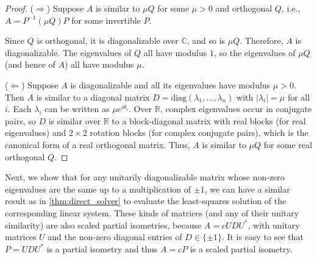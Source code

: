 \documentclass[a4paper,fleqn]{cas-sc}
\theoremstyle{definition}
\theoremstyle{remark}
\begin{document}




\begin{proof}
($\Rightarrow$) Suppose $A$ is similar to $\mu Q$ for some $\mu > 0$ and orthogonal $Q$, i.e., $A = P^{-1} (\mu Q) P$ for some invertible $P$. 

Since $Q$ is orthogonal, it is diagonalizable over $\mathbb{C}$, and so is $\mu Q$. Therefore, $A$ is diagonalizable. The eigenvalues of $Q$ all have modulus $1$, so the eigenvalues of $\mu Q$ (and hence of $A$) all have modulus $\mu$.

($\Leftarrow$) Suppose $A$ is diagonalizable and all its eigenvalues have modulus $\mu > 0$. Then $A$ is similar to a diagonal matrix $D = \mathrm{diag}(\lambda_1, \ldots, \lambda_n)$ with $|\lambda_i| = \mu$ for all $i$. Each $\lambda_i$ can be written as $\mu e^{i\theta_i}$. Over $\mathbb{R}$, complex eigenvalues occur in conjugate pairs, so $D$ is similar over $\mathbb{R}$ to a block-diagonal matrix with real blocks (for real eigenvalues) and $2 \times 2$ rotation blocks (for complex conjugate pairs), which is the canonical form of a real orthogonal matrix. Thus, $A$ is similar to $\mu Q$ for some real orthogonal $Q$.
\end{proof}

Next, we show that for any unitarily diagonalizable matrix whose non-zero eigenvalues are the same up to a multiplication of $\pm 1$, we can have a similar result as in \cref{thm:direct_solver} to evaluate the least-squares solution of the corresponding linear system. These kinds of matrices (and any of their unitary similarity) are also scaled partial isometries, because $A=cUDU^*$, with unitary matrices $U$ and the non-zero diagonal entries of $D \in \{\pm 1\}$. It is easy to see that $P=UDU^*$ is a partial isometry and thus $A=cP$ is a scaled partial isometry.
\end{document}
